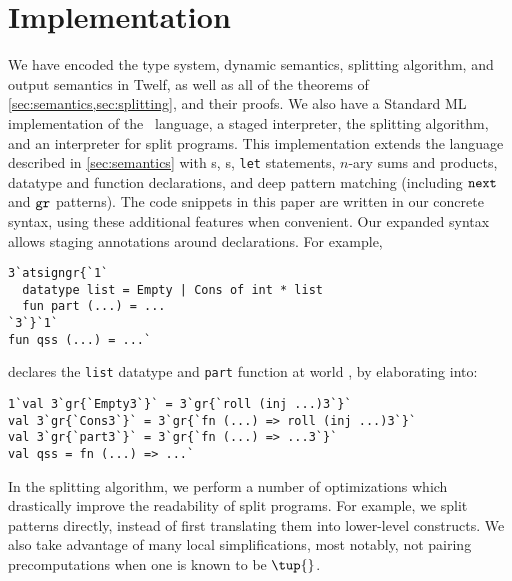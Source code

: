 
\section {Implementation}
\label{sec:implementation}

\begin{abstrsyn}
We have encoded the type system, dynamic semantics, splitting algorithm, and output semantics in Twelf,
as well as all of the theorems of \ref{sec:semantics,sec:splitting}, and their proofs. 
We also have a Standard ML implementation of the \lang\ language, a staged
interpreter, the splitting algorithm, and an interpreter for split programs.
This implementation extends the language described in \ref{sec:semantics} with 
\rmint{}s,
\rmbool{}s,
\texttt{let} statements,
$n$-ary sums and products,
datatype and function declarations, and
deep pattern matching (including ${\tt next}{}$ and ${\tt gr}{}$ patterns).
The code snippets in this paper are written in our concrete syntax, using 
these additional features when convenient.
Our expanded syntax allows staging annotations around declarations. For example,
\begin{lstlisting}
3`atsigngr{`1`
  datatype list = Empty | Cons of int * list
  fun part (...) = ...
`3`}`1`
fun qss (...) = ...`
\end{lstlisting}
declares the \texttt{list} datatype and \texttt{part} function at world \bbonep,
by elaborating into:
\begin{lstlisting}
1`val 3`gr{`Empty3`}` = 3`gr{`roll (inj ...)3`}`
val 3`gr{`Cons3`}` = 3`gr{`fn (...) => roll (inj ...)3`}`
val 3`gr{`part3`}` = 3`gr{`fn (...) => ...3`}`
val qss = fn (...) => ...`
\end{lstlisting}

In the splitting algorithm, we perform a number of optimizations which
drastically improve the readability of split programs. For example, we split
patterns directly, instead of first translating them into lower-level
constructs. We also take advantage of many local simplifications, most notably,
not pairing precomputations when one is known to be $\tup{}$.




\end{abstrsyn}
